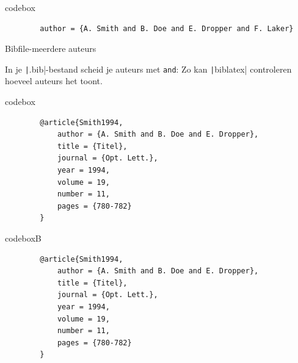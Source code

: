 
\begin{saveblock}{codebox}%
	\begin{verbatim}
		author = {A. Smith and B. Doe and E. Dropper and F. Laker}
	\end{verbatim}
\end{saveblock}



\begin{frame}{Bibfile-meerdere auteurs}
	
	In je \texttt|.bib|-bestand scheid je auteurs met \texttt{and}:
	Zo kan \texttt|biblatex| controleren hoeveel auteurs het toont.%


\end{frame}

\begin{saveblock}{codebox}%
	\begin{verbatim}
		@article{Smith1994,
			author = {A. Smith and B. Doe and E. Dropper},
			title = {Titel},
			journal = {Opt. Lett.},
			year = 1994,
			volume = 19,
			number = 11,
			pages = {780-782}
		}
	\end{verbatim}
\end{saveblock}


\begin{saveblock}{codeboxB}%
	\begin{verbatim}
		@article{Smith1994,
			author = {A. Smith and B. Doe and E. Dropper},
			title = {Titel},
			journal = {Opt. Lett.},
			year = 1994,
			volume = 19,
			number = 11,
			pages = {780-782}
		}
	\end{verbatim}
\end{saveblock}

